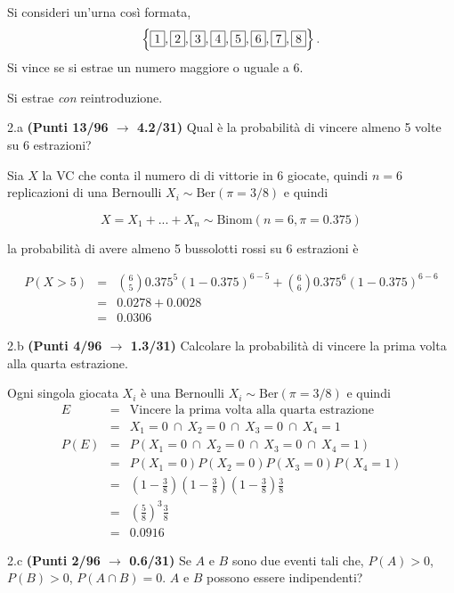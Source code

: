 \documentclass[
  11pt,
]{book}
\theoremstyle{mytheoremstyle}
\theoremstyle{mydefstyle}
\newenvironment{sol}
  {
  \begin{tcolorbox}[enhanced,breakable,arc=0.1mm,boxrule=1pt,colback=white,colframe=iblue,
  title=\bf \fontfamily{lmss}\selectfont \hspace{.5 cm} Soluzione,drop fuzzy shadow]

}{
\end{tcolorbox}
  }
\begin{document}
Si consideri un'urna così formata,
\[
\left\{\fbox{1},\fbox{2},\fbox{3},\fbox{4},\fbox{5},\fbox{6},\fbox{7},\fbox{8}\right\}.
\]
Si vince se si estrae un numero maggiore o uguale a 6.

Si estrae \emph{con} reintroduzione.

2.a \textbf{(Punti 13/96 \(\rightarrow\) 4.2/31)} Qual è la probabilità di vincere almeno 5 volte su 6 estrazioni?

\begin{sol}
Sia \(X\) la VC che conta il numero di di vittorie in 6 giocate,
quindi \(n=6\) replicazioni di una Bernoulli \(X_i\sim\mbox{Ber}(\pi=3/8)\) e quindi

\[
X=X_1+...+X_n\sim\mbox{Binom}(n=6,\pi=0.375)
\]

la probabilità di avere almeno 5 bussolotti rossi su 6 estrazioni è

\normalsize 
\begin{eqnarray*}
      P( X > 5 ) &=& \binom{ 6 }{ 5 } 0.375 ^{ 5 }(1- 0.375 )^{ 6 - 5 }+\binom{ 6 }{ 6 } 0.375 ^{ 6 }(1- 0.375 )^{ 6 - 6 } \\                 &=& 0.0278+0.0028 \\                 &=& 0.0306 
   \end{eqnarray*}
\normalsize 

\end{sol}

2.b \textbf{(Punti 4/96 \(\rightarrow\) 1.3/31)} Calcolare la probabilità di vincere la prima volta alla quarta estrazione.

\begin{sol}
Ogni singola giocata \(X_i\) è una Bernoulli \(X_i\sim\mbox{Ber}(\pi=3/8)\) e quindi
\begin{eqnarray*}
E&=&\text{Vincere la prima volta alla quarta estrazione}\\
 &=& X_1=0~\cap~X_2=0~\cap~X_3=0~\cap~X_4=1\\
P(E)&=&P(X_1=0~\cap~X_2=0~\cap~X_3=0~\cap~X_4=1)\\
&=&P(X_1=0)P(X_2=0)P(X_3=0)P(X_4=1)\\
&=&\left(1-\frac 38\right)\left(1-\frac 38\right)\left(1-\frac 38\right)\frac 38\\
&=&\left(\frac 58\right)^3\frac 38\\
&=&0.0916
\end{eqnarray*}

\end{sol}

2.c \textbf{(Punti 2/96 \(\rightarrow\) 0.6/31)} Se \(A\) e \(B\) sono due eventi tali che, \(P(A)>0\), \(P(B)>0\), \(P(A\cap B)=0\).
\(A\) e \(B\) possono essere indipendenti?
\end{document}
